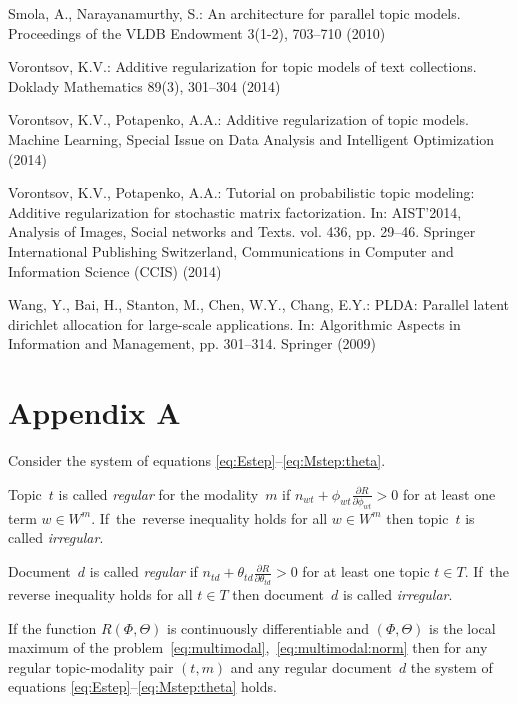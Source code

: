 \documentclass[russian]{llncs}
\begin{document}
\begin{thebibliography}{10}
Smola, A., Narayanamurthy, S.: An architecture for parallel topic models.
  Proceedings of the VLDB Endowment  3(1-2),  703--710 (2010)

Vorontsov, K.V.: Additive regularization for topic models of text collections.
  Doklady Mathematics  89(3),  301--304 (2014)

Vorontsov, K.V., Potapenko, A.A.: Additive regularization of topic models.
  Machine Learning, Special Issue on Data Analysis and Intelligent Optimization
   (2014)

Vorontsov, K.V., Potapenko, A.A.: Tutorial on probabilistic topic modeling:
  Additive regularization for stochastic matrix factorization. In: AIST'2014,
  Analysis of Images, Social networks and Texts. vol. 436, pp. 29--46. Springer
  International Publishing Switzerland, Communications in Computer and
  Information Science (CCIS) (2014)

Wang, Y., Bai, H., Stanton, M., Chen, W.Y., Chang, E.Y.: PLDA: Parallel latent
  dirichlet allocation for large-scale applications. In: Algorithmic Aspects in
  Information and Management, pp. 301--314. Springer (2009)

\end{thebibliography}

\newpage
\section*{Appendix A}

Consider the system of equations \eqref{eq:Estep}--\eqref{eq:Mstep:theta}.

Topic~$t$ is called \emph{regular} for the modality~$m$
if ${n_{wt} + \phi_{wt} \frac{\partial R}{\partial \phi_{wt}} > 0}$
for at least one term ${w\in W^m}$.
If~the~reverse inequality holds for all ${w\in W^m}$ then
topic~$t$ is called \emph{irregular}.

Document~$d$ is called \emph{regular}
if ${n_{td} + \theta_{td} \frac{\partial R}{\partial \theta_{td}} > 0}$
for at least one topic ${t\in T}$.
If~the reverse inequality holds for all ${t\in T}$ then
document~$d$ is called \emph{irregular}.

\begin{theorem}
\label{th:multimodal}
    If the function $R(\Phi,\Theta)$ is continuously differentiable
    and $(\Phi,\Theta)$ is the local maximum
    of the problem~\eqref{eq:multimodal},~\eqref{eq:multimodal:norm}
    then for any regular topic-modality pair $(t,m)$ and any regular document~$d$
    the system of equations \eqref{eq:Estep}--\eqref{eq:Mstep:theta} holds.
\end{theorem}
\end{document}
